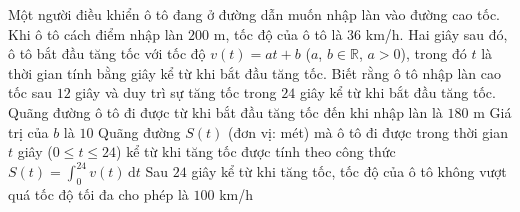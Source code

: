 \begin{ex}%
    Một người điều khiển ô tô đang ở đường dẫn muốn nhập làn vào đường cao tốc. Khi ô tô cách điểm nhập làn $200$ m, tốc độ của ô tô là $36$ km/h. Hai giây sau đó, ô tô bắt đầu tăng tốc với tốc độ $v(t) = at + b$ ($a$, $b \in \mathbb{R}$, $a > 0$), trong đó $t$ là thời gian tính bằng giây kể từ khi bắt đầu tăng tốc. Biết rằng ô tô nhập làn cao tốc sau $12$ giây và duy trì sự tăng tốc trong $24$ giây kể từ khi bắt đầu tăng tốc.
    \choiceTF
    {\True Quãng đường ô tô đi được từ khi bắt đầu tăng tốc đến khi nhập làn là $180$ m}
    {\True Giá trị của $b$ là $10$}
    {Quãng đường $S(t)$ (đơn vị: mét) mà ô tô đi được trong thời gian $t$ giây ($0 \leq t \leq 24$) kể từ khi tăng tốc được tính theo công thức $S(t) =\displaystyle \int_0^{24} v(t) \mathrm{\,d}t$}
    {Sau $24$ giây kể từ khi tăng tốc, tốc độ của ô tô không vượt quá tốc độ tối đa cho phép là $100$ km/h}
\end{ex}
